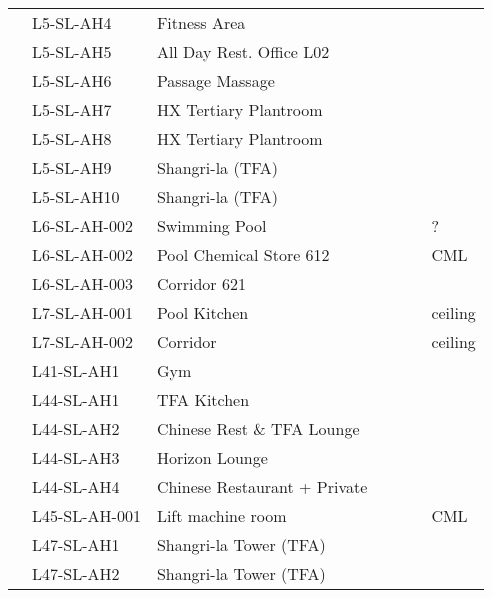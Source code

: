 {\begin{longtable}{lll c c c p{3cm}}
\inc	 	 &L5-SL-AH4	 &Fitness Area	  		 &\checkmark	 &&&\\
\inc	 	 &L5-SL-AH5	 &All Day Rest. Office L02	&\checkmark &	 &&\\
\inc	 	 &L5-SL-AH6	 &Passage Massage	 	 &\checkmark	 & &&\\

\inc	 	 &L5-SL-AH7	 &HX Tertiary Plantroom	 &\checkmark	 &&&\\
\inc	 	 &L5-SL-AH8	 &HX Tertiary Plantroom	 &\checkmark	 & &&\\

\inc	 	 &L5-SL-AH9	 &Shangri-la (TFA)	 	 &\checkmark	 & &&\\
\inc	 	 &L5-SL-AH10	 &Shangri-la (TFA)	 	 &\checkmark	 & &&\\


 
\midrule
\inc	 	 &L6-SL-AH-002	 & Swimming Pool	 &\checkmark  &&&?\\
\inc	 	 &L6-SL-AH-002	 &Pool Chemical Store 612	 &\checkmark  &&&CML \\
\inc	 	 &L6-SL-AH-003	 &Corridor 621	 	 	 &\checkmark &\ch&\ch &\\
\midrule



\inc	 	 &L7-SL-AH-001	 &Pool Kitchen	 &\checkmark  &&& ceiling\\
\inc	 	 &L7-SL-AH-002	 &Corridor	 	 &\checkmark  &&& ceiling\\
\midrule

\inc	 &L41-SL-AH1	 &Gym	 	 	  	 &\checkmark	 & &&\\
\midrule

\inc	 &L44-SL-AH1	 &TFA Kitchen	 	 	 &\checkmark& 	 && \\	 

\inc	 	 &L44-SL-AH2	 &Chinese Rest \& TFA Lounge	 &\checkmark	&  && \\ 	  	 	 

\inc	 	 &L44-SL-AH3	 &Horizon Lounge	 	 	&\checkmark  & &&\\	 	 
\inc	 	 &L44-SL-AH4	 &Chinese Restaurant + Private	&\checkmark&  & &\\	 	 
\midrule

\inc	 	 &L45-SL-AH-001	 &Lift machine room	&\checkmark &&& CML\\ 
\midrule

\inc	 	 &L47-SL-AH1	 &Shangri-la Tower (TFA)	&\checkmark&&&\\

\inc	 	 &L47-SL-AH2	 &Shangri-la Tower (TFA)	&\checkmark&&&\\
\bottomrule
\end{longtable}
}




